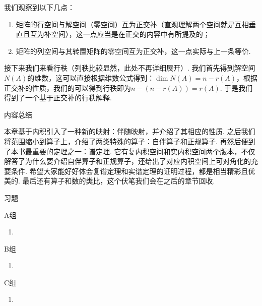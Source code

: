 我们观察到以下几点：
\begin{enumerate}
    \item 矩阵的行空间与解空间（零空间）互为正交补（直观理解两个空间就是互相垂直且互为补空间），这一点应当是在正交的内容中有所提及的；

    \item 矩阵的列空间与其转置矩阵的零空间互为正交补，这一点实际与上一条等价.
\end{enumerate}

接下来我们来看行秩（列秩比较显然，此处不再详细展开）. 我们首先得到解空间$N(A)$的维数，这可以直接根据维数公式得到：$\dim N(A) = n-r(A)$，根据正交补的性质，我们的可以得到行秩即为$n-(n-r(A))=r(A)$. 于是我们得到了一个基于正交补的行秩解释.

\vspace{2ex}
\centerline{\heiti \Large 内容总结}

本章基于内积引入了一种新的映射：伴随映射，并介绍了其相应的性质. 之后我们将范围缩小到算子上，介绍了两类特殊的算子：自伴算子和正规算子. 再然后便到了本书最重要的定理之一：谱定理. 它有复内积空间和实内积空间两个版本，不仅解答了为什么要介绍自伴算子和正规算子，还给出了对应内积空间上可对角化的充要条件. 希望大家能好好体会复谱定理和实谱定理的证明过程，都是相当精彩且优美的. 最后还有算子和数的类比，这个伏笔我们会在之后的章节回收.

\vspace{2ex}
\centerline{\heiti \Large 习题}

\vspace{2ex}
{\kaishu }
\begin{flushright}
    \kaishu

\end{flushright}

\centerline{\heiti A组}
\begin{enumerate}
    \item
\end{enumerate}

\centerline{\heiti B组}
\begin{enumerate}
    \item
\end{enumerate}

\centerline{\heiti C组}
\begin{enumerate}
    \item
\end{enumerate}

